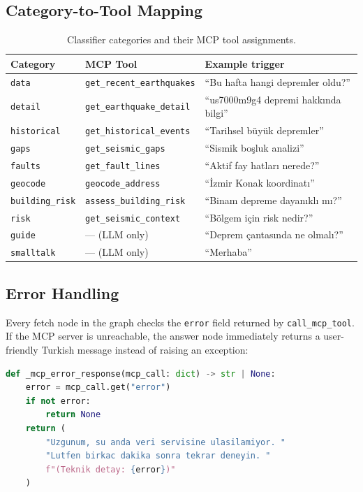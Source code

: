 \documentclass[11pt,a4paper]{article}
\begin{document}
\subsection{Category-to-Tool Mapping}

\begin{table}[H]
\centering
\begin{tabular}{@{}lll@{}}
\toprule
\textbf{Category} & \textbf{MCP Tool} & \textbf{Example trigger} \\
\midrule
\texttt{data}          & \texttt{get\_recent\_earthquakes}  & ``Bu hafta hangi depremler oldu?'' \\
\texttt{detail}        & \texttt{get\_earthquake\_detail}   & ``us7000m9g4 depremi hakkında bilgi'' \\
\texttt{historical}    & \texttt{get\_historical\_events}   & ``Tarihsel büyük depremler'' \\
\texttt{gaps}          & \texttt{get\_seismic\_gaps}        & ``Sismik boşluk analizi'' \\
\texttt{faults}        & \texttt{get\_fault\_lines}         & ``Aktif fay hatları nerede?'' \\
\texttt{geocode}       & \texttt{geocode\_address}          & ``İzmir Konak koordinatı'' \\
\texttt{building\_risk}& \texttt{assess\_building\_risk}    & ``Binam depreme dayanıklı mı?'' \\
\texttt{risk}          & \texttt{get\_seismic\_context}     & ``Bölgem için risk nedir?'' \\
\texttt{guide}         & --- (LLM only)                     & ``Deprem çantasında ne olmalı?'' \\
\texttt{smalltalk}     & --- (LLM only)                     & ``Merhaba'' \\
\bottomrule
\end{tabular}
\caption{Classifier categories and their MCP tool assignments.}
\end{table}

\subsection{Error Handling}

Every fetch node in the graph checks the \texttt{error} field returned by
\texttt{call\_mcp\_tool}. If the MCP server is unreachable, the answer node
immediately returns a user-friendly Turkish message instead of raising an exception:

\begin{lstlisting}[style=codestyle, language=Python]
def _mcp_error_response(mcp_call: dict) -> str | None:
    error = mcp_call.get("error")
    if not error:
        return None
    return (
        "Uzgunum, su anda veri servisine ulasilamiyor. "
        "Lutfen birkac dakika sonra tekrar deneyin. "
        f"(Teknik detay: {error})"
    )
\end{lstlisting}
\end{document}
